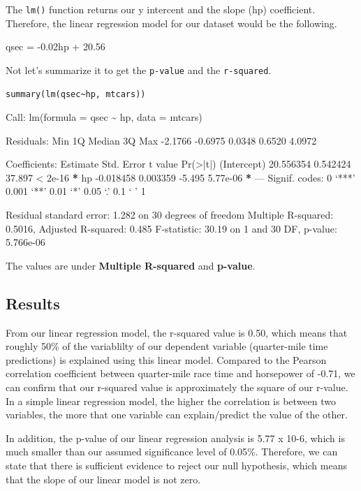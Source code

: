 \documentclass[11pt]{article}
\begin{document}
The \texttt{lm()} function returns our y intercent and the slope (hp) coefficient. Therefore, the linear regression model for our dataset would be the following.

qsec = -0.02hp + 20.56

Not let's summarize it to get the \texttt{p-value} and the \texttt{r-squared}.

\begin{verbatim}
summary(lm(qsec~hp, mtcars))
\end{verbatim}

\begin{org}


Call:
lm(formula = qsec \textasciitilde{} hp, data = mtcars)

Residuals:
    Min      1Q  Median      3Q     Max
-2.1766 -0.6975  0.0348  0.6520  4.0972

Coefficients:
             Estimate Std. Error t value Pr(>|t|)
(Intercept) 20.556354   0.542424  37.897  < 2e-16 \textbf{*}
hp          -0.018458   0.003359  -5.495 5.77e-06 \textbf{*}
---
Signif. codes:  0 ‘***’ 0.001 ‘**’ 0.01 ‘*’ 0.05 ‘.’ 0.1 ‘ ’ 1

Residual standard error: 1.282 on 30 degrees of freedom
Multiple R-squared:  0.5016,	Adjusted R-squared:  0.485
F-statistic: 30.19 on 1 and 30 DF,  p-value: 5.766e-06
\end{org}

The values are under \textbf{Multiple R-squared} and \textbf{p-value}.

\subsection{Results}
\label{sec:org982297a}

From our linear regression model, the r-squared value is 0.50, which means that roughly 50\% of the variablilty of our dependent variable (quarter-mile time predictions) is explained using this linear model. Compared to the Pearson correlation coefficient between quarter-mile race time and horsepower of -0.71, we can confirm that our r-squared value is approximately the square of our r-value. In a simple linear regression model, the higher the correlation is between two variables, the more that one variable can explain/predict the value of the other.

In addition, the p-value of our linear regression analysis is 5.77 x 10-6, which is much smaller than our assumed significance level of 0.05\%. Therefore, we can state that there is sufficient evidence to reject our null hypothesis, which means that the slope of our linear model is not zero.
\end{document}
